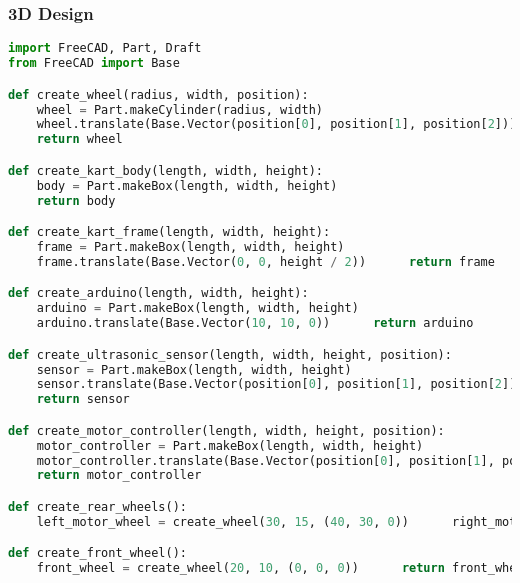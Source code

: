 \documentclass[a4paper,12pt]{report}
\begin{document}
\subsubsection{3D Design}
\begin{lstlisting}[language=Python]
import FreeCAD, Part, Draft
from FreeCAD import Base

def create_wheel(radius, width, position):
    wheel = Part.makeCylinder(radius, width)
    wheel.translate(Base.Vector(position[0], position[1], position[2]))
    return wheel

def create_kart_body(length, width, height):
    body = Part.makeBox(length, width, height)
    return body

def create_kart_frame(length, width, height):
    frame = Part.makeBox(length, width, height)
    frame.translate(Base.Vector(0, 0, height / 2))      return frame

def create_arduino(length, width, height):
    arduino = Part.makeBox(length, width, height)
    arduino.translate(Base.Vector(10, 10, 0))      return arduino

def create_ultrasonic_sensor(length, width, height, position):
    sensor = Part.makeBox(length, width, height)
    sensor.translate(Base.Vector(position[0], position[1], position[2]))
    return sensor

def create_motor_controller(length, width, height, position):
    motor_controller = Part.makeBox(length, width, height)
    motor_controller.translate(Base.Vector(position[0], position[1], position[2]))
    return motor_controller

def create_rear_wheels():
    left_motor_wheel = create_wheel(30, 15, (40, 30, 0))      right_motor_wheel = create_wheel(30, 15, (40, -30, 0))      return left_motor_wheel, right_motor_wheel

def create_front_wheel():
    front_wheel = create_wheel(20, 10, (0, 0, 0))      return front_wheel
\end{lstlisting}
\end{document}

